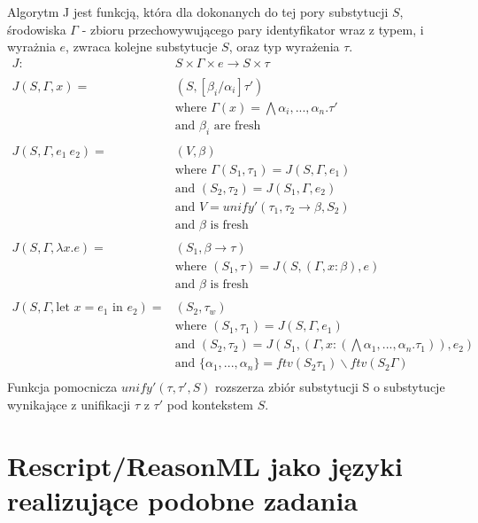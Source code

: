 \documentclass{article}
\begin{document}
Algorytm J jest funkcją, która dla dokonanych do tej pory substytucji $S$, środowiska $\Gamma$ - zbioru przechowywującego pary identyfikator wraz z typem, i wyrażnia $e$, zwraca kolejne substytucje $S$, oraz typ wyrażenia $\tau$.
\begin{equation}
  \begin{split}
    J :& S\times\Gamma\times e \rightarrow S\times\tau \\
    \\
    J(S,\Gamma,x) =& (S,[\beta_i/\alpha_i]\tau') \\
    &\text{where } \Gamma(x) = \bigwedge\alpha_i,...,\alpha_n.\tau' \\
    &\text{and } \beta_i \text{ are fresh} \\
    \\
    J(S,\Gamma,e_1\ e_2) =& (V,\beta) \\
    &\text{where } \Gamma(S_1,\tau_1) = J(S,\Gamma,e_1) \\
    &\text{and } (S_2,\tau_2)=J(S_1,\Gamma,e_2) \\
    &\text{and } V = unify'(\tau_1,\tau_2\rightarrow\beta,S_2) \\
    &\text{and } \beta \text{ is fresh} \\
    \\
    J(S,\Gamma,\lambda x.e) =& (S_1,\beta\rightarrow\tau) \\
    &\text{where } (S_1,\tau)=J(S,(\Gamma,x:\beta),e) \\
    &\text{and } \beta \text{ is fresh} \\
    \\
    J(S,\Gamma,\text{let }x=e_1\text{ in }e_2) =& (S_2,\tau_w) \\
    &\text{where } (S_1,\tau_1)=J(S,\Gamma,e_1) \\
    &\text{and } (S_2,\tau_2)=J(S_1,(\Gamma,x:(\bigwedge\alpha_1,...,\alpha_n.\tau_1)),e_2) \\
    &\text{and } \{\alpha_1,...,\alpha_n\}=ftv(S_2\tau_1)\backslash ftv(S_2\Gamma) \\
  \end{split}
\end{equation}
Funkcja pomocnicza $unify'(\tau,\tau',S)$ rozszerza zbiór substytucji S o substytucje wynikające z unifikacji $\tau$ z $\tau'$ pod kontekstem $S$.


\section{Rescript/ReasonML jako języki realizujące podobne zadania}
\newpage
\end{document}
